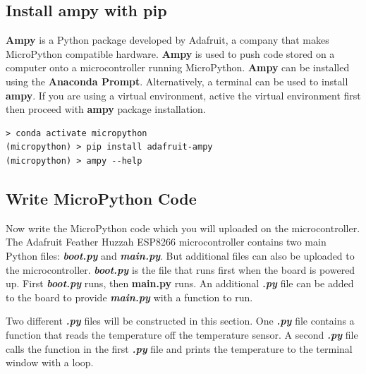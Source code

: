 \documentclass{book}
\begin{document}
    
        \subsection{Install ampy with pip}\label{install-ampy-with-pip}

\textbf{Ampy} is a Python package developed by Adafruit, a company that
makes MicroPython compatible hardware. \textbf{Ampy} is used to push
code stored on a computer onto a microcontroller running MicroPython.
\textbf{Ampy} can be installed using the \textbf{Anaconda Prompt}.
Alternatively, a terminal can be used to install \textbf{ampy}. If you
are using a virtual environment, active the virtual environment first
then proceed with \textbf{ampy} package installation.
    




    
        \begin{lstlisting}
> conda activate micropython
(micropython) > pip install adafruit-ampy
(micropython) > ampy --help
\end{lstlisting}
    




    
        \subsection{Write MicroPython Code}\label{write-micropython-code}
    




    
        Now write the MicroPython code which you will uploaded on the
microcontroller. The Adafruit Feather Huzzah ESP8266 microcontroller
contains two main Python files: \textbf{\emph{boot.py}} and
\textbf{\emph{main.py}}. But additional files can also be uploaded to
the microcontroller. \textbf{\emph{boot.py}} is the file that runs first
when the board is powered up. First \textbf{\emph{boot.py}} runs, then
\textbf{main.py} runs. An additional \textbf{\emph{.py}} file can be
added to the board to provide \textbf{\emph{main.py}} with a function to
run.

Two different \textbf{\emph{.py}} files will be constructed in this
section. One \textbf{\emph{.py}} file contains a function that reads the
temperature off the temperature sensor. A second \textbf{\emph{.py}}
file calls the function in the first \textbf{\emph{.py}} file and prints
the temperature to the terminal window with a loop.
    
\end{document}
